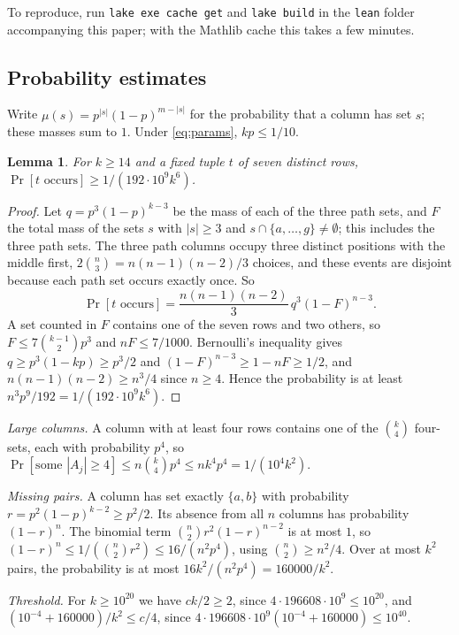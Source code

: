 \documentclass[11pt]{article}
\newtheorem{lemma}[theorem]{Lemma}
\theoremstyle{remark}
\begin{document}
To reproduce, run \texttt{lake exe cache get} and \texttt{lake build} in
the \texttt{lean} folder accompanying this paper; with the Mathlib cache
this takes a few minutes.

\begin{appendices}
\section{Probability estimates}\label{app:prob}

Write $\mu(s)=p^{|s|}(1-p)^{m-|s|}$ for the probability that a column has
set $s$; these masses sum to $1$. Under \eqref{eq:params},
$kp\le1/10$.

\begin{lemma}\label{lem:path}
For $k\ge14$ and a fixed tuple $t$ of seven distinct rows,
$\Pr[t\text{ occurs}]\ge1/(192\cdot10^9k^6)$.
\end{lemma}

\begin{proof}
Let $q=p^3(1-p)^{k-3}$ be the mass of each of the three path sets, and $F$
the total mass of the sets $s$ with $|s|\ge3$ and
$s\cap\{a,\dots,g\}\ne\emptyset$; this includes the three path sets. The three path columns occupy three distinct positions with the
middle first, $2\binom n3=n(n-1)(n-2)/3$ choices, and these events are
disjoint because each path set occurs exactly once. So
\[
 \Pr[t\text{ occurs}]=\frac{n(n-1)(n-2)}3\,q^3(1-F)^{n-3}.
\]
A set counted in $F$ contains one of the seven rows and two others, so
$F\le7\binom{k-1}2p^3$ and $nF\le7/1000$. Bernoulli's inequality gives
$q\ge p^3(1-kp)\ge p^3/2$ and $(1-F)^{n-3}\ge1-nF\ge1/2$, and
$n(n-1)(n-2)\ge n^3/4$ since $n\ge4$. Hence the probability is at least
$n^3p^9/192=1/(192\cdot10^9k^6)$.
\end{proof}

\emph{Large columns.} A column with at least four rows contains one of the
$\binom k4$ four-sets, each with probability $p^4$, so
$\Pr[\text{some }|A_j|\ge4]\le n\binom k4p^4\le nk^4p^4=1/(10^4k^2)$.

\emph{Missing pairs.} A column has set exactly $\{a,b\}$ with probability
$r=p^2(1-p)^{k-2}\ge p^2/2$. Its absence from all $n$ columns has
probability $(1-r)^n$. The binomial term $\binom n2r^2(1-r)^{n-2}$ is at
most $1$, so $(1-r)^n\le1/(\binom n2r^2)\le16/(n^2p^4)$, using
$\binom n2\ge n^2/4$. Over at most $k^2$ pairs, the probability is at most
$16k^2/(n^2p^4)=160000/k^2$.

\emph{Threshold.} For $k\ge10^{20}$ we have $ck/2\ge2$, since
$4\cdot196608\cdot10^9\le10^{20}$, and $(10^{-4}+160000)/k^2\le c/4$,
since $4\cdot196608\cdot10^9(10^{-4}+160000)\le10^{40}$.


\end{appendices}
\end{document}
